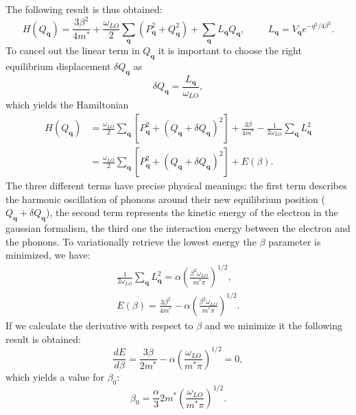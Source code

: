 \documentclass[12pt, a4paper]{report}
\numberwithin{equation}{section}
\begin{document}
The following result is thus obtained:
\begin{equation}
    H(Q_\mathbf{q})=\frac{3\beta^2}{4m^*}+\frac{\omega_{LO}}{2}\sum_\mathbf{q}(P_\mathbf{q}^2+Q_\mathbf{q}^2)+\sum_\mathbf{q}L_\mathbf{q}Q_\mathbf{q},\hspace{1cm}L_\mathbf{q}=V_\mathbf{q}e^{-q^2/4\beta^2}.
\end{equation}
To cancel out the linear term in $Q_\mathbf{q}$ it is important to choose the right equilibrium displacement $\delta Q_\mathbf{q}$ as
\begin{equation}
    \delta Q_\mathbf{q}=\frac{L_\mathbf{q}}{\omega_{LO}},
\end{equation}
which yields the Hamiltonian
\begin{equation}
\begin{split}
    H(Q_\mathbf{q})&=\frac{\omega_{LO}}{2}\sum_\mathbf{q}\left[P^2_\mathbf{q}+(Q_\mathbf{q}+\delta Q_\mathbf{q})^2\right]+\frac{3\beta}{4m^*}-\frac{1}{2\omega_{LO}}\sum_\mathbf{q}L^2_\mathbf{q}\\
    &=\frac{\omega_{LO}}{2}\sum_\mathbf{q}\left[P^2_\mathbf{q}+\left(Q_\mathbf{q}+\delta Q_\mathbf{q}\right)^2\right]+E(\beta).
\end{split}
\end{equation}
The three different terms have precise physical meanings: the first term describes the harmonic oscillation of phonons around their new 
equilibrium position ($Q_\mathbf{q}+\delta Q_\mathbf{q}$), the second term represents the kinetic energy of the electron in the gaussian 
formalism, the third one the interaction energy between the electron and the phonons. To variationally retrieve the lowest energy the 
$\beta$ parameter is minimized, we have:
\begin{equation}
\begin{split}
    \frac{1}{2\omega_{LO}}\sum_\mathbf{q}L^2_\mathbf{q}=\alpha\left(\frac{\beta^2\omega_{LO}}{m^*\pi}\right)^{1/2},\\
    E(\beta)=\frac{3\beta^2}{4m^*}-\alpha\left(\frac{\beta^2\omega_{LO}}{m^*\pi}\right)^{1/2}.
\end{split}
\end{equation}
If we calculate the derivative with respect to $\beta$ and we minimize it the following result is obtained:
\begin{equation}
    \frac{dE}{d\beta}=\frac{3\beta}{2m^*}-\alpha\left(\frac{\omega_{LO}}{m^*\pi}\right)^{1/2}=0,
\end{equation}
which yields a value for $\beta_0$:
\begin{equation}
    \beta_0=\frac{\alpha}{3}2m^*\left(\frac{\omega_{LO}}{m^*\pi}\right)^{1/2}.
\end{equation}
\end{document}
